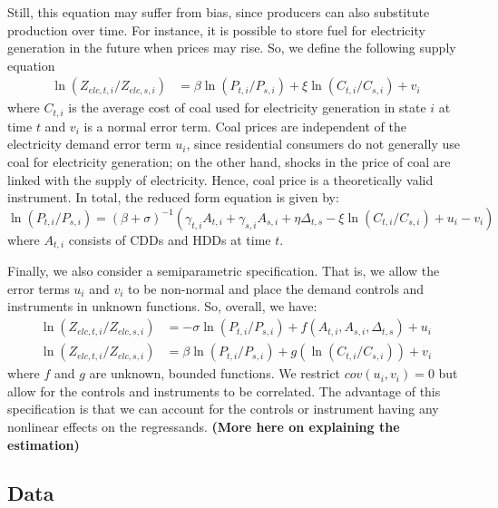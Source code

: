 \documentclass[12pt,a4paper]{extarticle}
\begin{document}
Still, this equation may suffer from bias, since producers can also substitute production over time. For instance, it is possible to store fuel for electricity generation in the future when prices may rise. So, we define the following supply equation
\begin{align*}
\ln (Z_{elc, t, i} / Z_{elc, s, i}) &= \beta \ln (P_{t,i} / P_{s,i}) + \xi \ln (C_{t,i} / C_{s,i}) + v_{i}
\end{align*}
where $C_{t,i}$ is the average cost of coal used for electricity generation in state $i$ at time $t$ and $v_i$ is a normal error term. Coal prices are independent of the electricity demand error term $u_i$, since residential consumers do not generally use coal for electricity generation; on the other hand, shocks in the price of coal are linked with the supply of electricity. Hence, coal price is a theoretically valid instrument.  In total, the reduced form equation is given by:
$$ \ln (P_{t,i} / P_{s,i}) = \left( \beta + \sigma \right)^{-1} \left( \gamma_{t,i} A_{t,i} + \gamma_{s,i} A_{s,i} + \eta \Delta_{t,s} - \xi \ln (C_{t,i} / C_{s,i}) + u_{i} - v_i \right)  $$
where $A_{t,i}$ consists of CDDs and HDDs at time $t$. 

Finally, we also consider a semiparametric specification. That is, we allow the error terms $u_i$ and $v_i$ to be non-normal and place the demand controls and instruments in unknown functions. So, overall, we have:
\begin{align*}
\ln (Z_{elc, t, i} / Z_{elc, s, i}) &= -\sigma \ln (P_{t,i} / P_{s,i}) +  f \left( A_{t,i}, A_{s,i}, \Delta_{t,s} \right) + u_i \\
\ln (Z_{elc, t, i} / Z_{elc, s, i}) &= \beta \ln (P_{t,i} / P_{s,i}) + g \left( \ln (C_{t,i} / C_{s,i})  \right) + v_{i}
\end{align*}
where $f$ and $g$ are unknown, bounded functions. We restrict $cov(u_i, v_i) = 0$ but allow for the controls and instruments to be correlated. The advantage of this specification is that we can account for the controls or instrument having any nonlinear effects on the regressands. \textbf{(More here on explaining the estimation)}

\subsection{Data}
\end{document}

